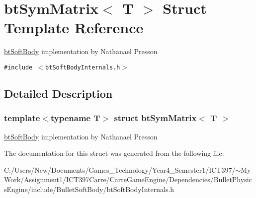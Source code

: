 \hypertarget{structbt_sym_matrix}{
\section{btSymMatrix$<$ T $>$ Struct Template Reference}
\label{structbt_sym_matrix}
}
\hyperlink{classbt_soft_body}{btSoftBody} implementation by Nathanael Presson  


{\tt \#include $<$btSoftBodyInternals.h$>$}



\subsection{Detailed Description}
\subsubsection*{template$<$typename T$>$ struct btSymMatrix$<$ T $>$}

\hyperlink{classbt_soft_body}{btSoftBody} implementation by Nathanael Presson 

The documentation for this struct was generated from the following file:\begin{CompactItemize}
\item 
C:/Users/New/Documents/Games\_\-Technology/Year4\_\-Semester1/ICT397/$\sim$My Work/Assignment1/ICT397Carre/CarreGameEngine/Dependencies/BulletPhysicsEngine/include/BulletSoftBody/btSoftBodyInternals.h\end{CompactItemize}

